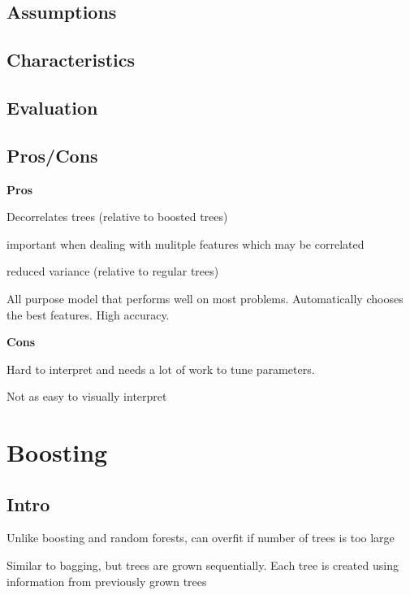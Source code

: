 \documentclass[]{book}
\begin{document}
\hypertarget{assumptions-7}{%
\subsection{Assumptions}\label{assumptions-7}}

\hypertarget{characteristics-6}{%
\subsection{Characteristics}\label{characteristics-6}}

\hypertarget{evaluation-7}{%
\subsection{Evaluation}\label{evaluation-7}}

\hypertarget{proscons-7}{%
\subsection{Pros/Cons}\label{proscons-7}}

\textbf{Pros}

Decorrelates trees (relative to boosted trees)

important when dealing with mulitple features which may be correlated

reduced variance (relative to regular trees)

All purpose model that performs well on most problems. Automatically chooses the best features. High accuracy.

\textbf{Cons}

Hard to interpret and needs a lot of work to tune parameters.

Not as easy to visually interpret

\hypertarget{boosting}{%
\section{Boosting}\label{boosting}}

\hypertarget{intro-8}{%
\subsection{Intro}\label{intro-8}}

Unlike boosting and random forests, can overfit if number of trees is too large

Similar to bagging, but trees are grown sequentially. Each tree is created using information from previously grown trees
\end{document}
